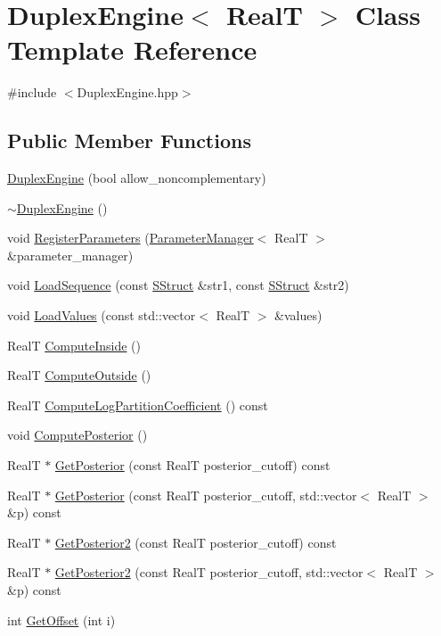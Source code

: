 \hypertarget{class_duplex_engine}{\section{Duplex\+Engine$<$ Real\+T $>$ Class Template Reference}
\label{class_duplex_engine}
}


{\ttfamily \#include $<$Duplex\+Engine.\+hpp$>$}

\subsection*{Public Member Functions}
\begin{DoxyCompactItemize}
\item 
\hyperlink{class_duplex_engine_a269c4e5b7aa77a75263980fc5a495ac1}{Duplex\+Engine} (bool allow\+\_\+noncomplementary)
\item 
\hyperlink{class_duplex_engine_a18c61a437957eba7f4d52e7ea6338ab9}{$\sim$\+Duplex\+Engine} ()
\item 
void \hyperlink{class_duplex_engine_a4c46b854fc495da118e7b2f6b969593b}{Register\+Parameters} (\hyperlink{class_parameter_manager}{Parameter\+Manager}$<$ Real\+T $>$ \&parameter\+\_\+manager)
\item 
void \hyperlink{class_duplex_engine_ad37f512741fa0bc7f3aeb295d94ac17a}{Load\+Sequence} (const \hyperlink{class_s_struct}{S\+Struct} \&str1, const \hyperlink{class_s_struct}{S\+Struct} \&str2)
\item 
void \hyperlink{class_duplex_engine_a70e2faa723fc6e59007f17df9220b2de}{Load\+Values} (const std\+::vector$<$ Real\+T $>$ \&values)
\item 
Real\+T \hyperlink{class_duplex_engine_a1d6a1a3e4890fd62802392fb4928f4fb}{Compute\+Inside} ()
\item 
Real\+T \hyperlink{class_duplex_engine_a48585f0f515bf7ad3335e9f9b5efb1f4}{Compute\+Outside} ()
\item 
Real\+T \hyperlink{class_duplex_engine_a1ae8e94a77aa4551e94b4f8f5eec1a28}{Compute\+Log\+Partition\+Coefficient} () const 
\item 
void \hyperlink{class_duplex_engine_a9f863ddf131bccd4c1d9b902b4875dbc}{Compute\+Posterior} ()
\item 
Real\+T $\ast$ \hyperlink{class_duplex_engine_aea11650f89b2c9081ca206261f0b0e14}{Get\+Posterior} (const Real\+T posterior\+\_\+cutoff) const 
\item 
Real\+T $\ast$ \hyperlink{class_duplex_engine_a019d1cc1a5ba82799b51bcad4a267cf2}{Get\+Posterior} (const Real\+T posterior\+\_\+cutoff, std\+::vector$<$ Real\+T $>$ \&p) const 
\item 
Real\+T $\ast$ \hyperlink{class_duplex_engine_a17a01513a22bfdc76cbf2fb79eb0fa33}{Get\+Posterior2} (const Real\+T posterior\+\_\+cutoff) const 
\item 
Real\+T $\ast$ \hyperlink{class_duplex_engine_a32c8d8dde69945097e1c6d408e9953db}{Get\+Posterior2} (const Real\+T posterior\+\_\+cutoff, std\+::vector$<$ Real\+T $>$ \&p) const 
\item 
int \hyperlink{class_duplex_engine_afaba7c8d1bb9ac099c4d897f77dfaf80}{Get\+Offset} (int i)
\end{DoxyCompactItemize}


